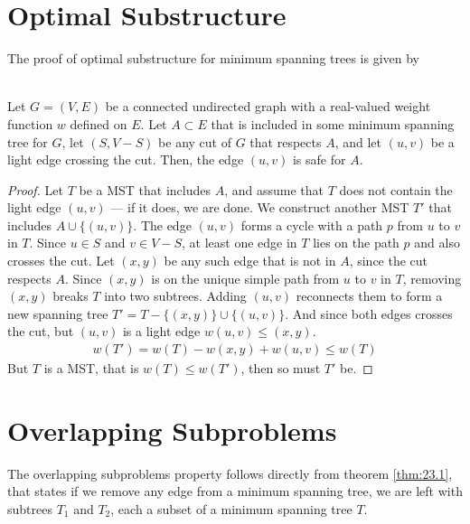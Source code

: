 \section{Optimal Substructure}
The proof of optimal substructure for minimum spanning trees is given by
\begin{theorem} \cite[23.1, p. 626]{clrs} \\
\label{thm:23.1}
\textnormal
{
	Let $G = (V, E)$ be a connected undirected graph with a real-valued weight
	function $w$ defined on $E$. Let $A \subset E$ that is included in some
	minimum spanning tree for $G$, let $(S, V - S)$ be any cut of $G$ that
	respects $A$, and let $(u, v)$ be a light edge crossing the cut. Then, the
	edge $(u, v)$ is safe for $A$.
}
\end{theorem}

\begin{proof}
	Let $T$ be a MST that includes $A$, and assume that $T$ does not contain
	the light edge $(u, v)$ --- if it does, we are done. We construct another
	MST $T'$ that includes $A \cup \{(u, v)\}$. The edge $(u, v)$ forms a
	cycle with a path $p$ from $u$ to $v$ in $T$. Since $u \in S$ and
	$v \in V - S$, at least one edge in $T$ lies on the path $p$ and also
	crosses the cut. Let $(x, y)$ be any such edge that is not in $A$, since
	the cut respects $A$. Since $(x, y)$ is on the unique simple path from $u$
	to $v$ in $T$, removing $(x, y)$ breaks $T$ into two subtrees. Adding
	$(u, v)$ reconnects them to form a new spanning tree $T' = T - \{(x, y)\}
	\cup \{(u, v)\}$. And since both edges crosses the cut, but $(u, v)$ is a
	light edge $w(u, v) \leq (x, y)$.
	\begin{align}
		w(T') = w(T) - w(x, y) + w(u, v) \leq w(T)
	\end{align}
	But $T$ is a MST, that is $w(T) \leq w(T')$, then so must $T'$ be.
\end{proof}

\section{Overlapping Subproblems}
The overlapping subproblems property follows directly from theorem
\ref{thm:23.1}, that states if we remove any edge from a minimum spanning
tree, we are left with subtrees $T_1$ and $T_2$, each a subset of a
minimum spanning tree $T$.

\newpage
